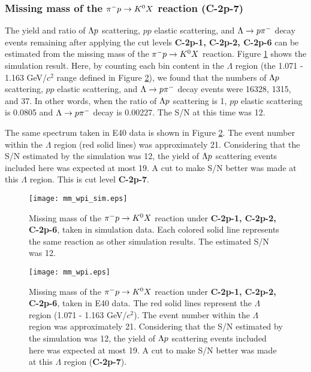 \subsubsection{Missing mass of the $\pi^- p \to K^0 X$ reaction ({\bf C-2p-7})}

The yield and ratio of $\Lambda p$ scattering, $pp$ elastic scattering, and $\Lambda\to p\pi^{-}$ decay events remaining after applying the cut levels {\bf C-2p-1, C-2p-2, C-2p-6} can be estimated from the missing mass of the $\pi^- p \to K^0 X$ reaction. Figure \ref{fig-mm_wpi_sim} shows the simulation result. Here, by counting each bin content in the $\Lambda$ region (the 1.071 - 1.163 GeV/$c^{2}$ range defined in Figure \ref{fig-mm_wpi}), we found that the numbers of $\Lambda p$ scattering, $pp$ elastic scattering, and $\Lambda\to p\pi^{-}$ decay events were 16328, 1315, and 37. In other words, when the ratio of $\Lambda p$ scattering is 1, $pp$ elastic scattering is 0.0805 and $\Lambda\to p\pi^{-}$ decay is 0.00227. The S/N at this time was 12. 

The same spectrum taken in E40 data is shown in Figure \ref{fig-mm_wpi}. The event number within the $\Lambda$ region (red solid lines) was approximately 21. Considering that the S/N estimated by the simulation was 12, the yield of $\Lambda p$ scattering events included here was expected at most 19. A cut to make S/N better was made at this $\Lambda$ region. This is cut level {\bf C-2p-7}.

\begin{figure}[!h]
  \begin{center}
    \texttt{[image: mm\_wpi\_sim.eps]}
    \caption{Missing mass of the $\pi^- p \to K^0 X$ reaction under {\bf C-2p-1, C-2p-2, C-2p-6}, taken in simulation data. Each colored solid line represents the same reaction as other simulation results. The estimated S/N was 12.}
    \label{fig-mm_wpi_sim}
  \end{center}
\end{figure}

\begin{figure}[!h]
  \begin{center}
    \texttt{[image: mm\_wpi.eps]}
    \caption{Missing mass of the $\pi^- p \to K^0 X$ reaction under {\bf C-2p-1, C-2p-2, C-2p-6}, taken in E40 data. The red solid lines represent the $\Lambda$ region (1.071 - 1.163 GeV/$c^{2}$). The event number within the $\Lambda$ region was approximately 21. Considering that the S/N estimated by the simulation was 12, the yield of $\Lambda p$ scattering events included here was expected at most 19. A cut to make S/N better was made at this $\Lambda$ region ({\bf C-2p-7}).}
    \label{fig-mm_wpi}
  \end{center}
\end{figure}

